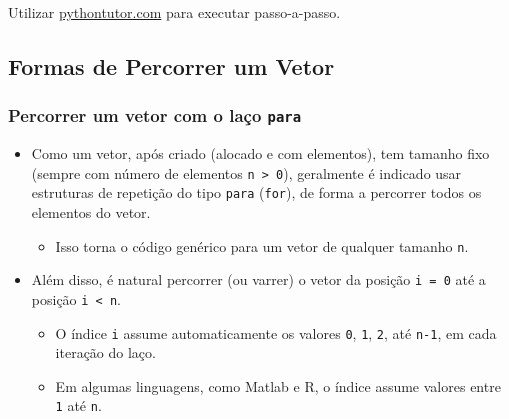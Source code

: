 \documentclass[12pt,a4paper]{article}
\providecommand{\tightlist}{%
      \setlength{\itemsep}{0pt}\setlength{\parskip}{0pt}}
\begin{document}
    Utilizar \href{https://pythontutor.com/}{pythontutor.com} para executar
passo-a-passo.

    \hypertarget{formas-de-percorrer-um-vetor}{%
\subsection{Formas de Percorrer um
Vetor}\label{formas-de-percorrer-um-vetor}}

    \hypertarget{percorrer-um-vetor-com-o-lauxe7o-para}{%
\subsubsection{\texorpdfstring{Percorrer um vetor com o laço
\texttt{para}}{Percorrer um vetor com o laço para}}\label{percorrer-um-vetor-com-o-lauxe7o-para}}

    \begin{itemize}
\tightlist
\item
  Como um vetor, após criado (alocado e com elementos), tem tamanho fixo
  (sempre com número de elementos \texttt{n\ \textgreater{}\ 0}),
  geralmente é indicado usar estruturas de repetição do tipo
  \texttt{para} (\texttt{for}), de forma a percorrer todos os elementos
  do vetor.

  \begin{itemize}
  \tightlist
  \item
    Isso torna o código genérico para um vetor de qualquer tamanho
    \texttt{n}.
  \end{itemize}
\item
  Além disso, é natural percorrer (ou varrer) o vetor da posição
  \texttt{i\ =\ 0} até a posição \texttt{i\ \textless{}\ n}.

  \begin{itemize}
  \tightlist
  \item
    O índice \texttt{i} assume automaticamente os valores \texttt{0},
    \texttt{1}, \texttt{2}, até \texttt{n-1}, em cada iteração do laço.
  \item
    Em algumas linguagens, como Matlab e R, o índice assume valores
    entre \texttt{1} até \texttt{n}.
  \end{itemize}
\end{itemize}
\end{document}
